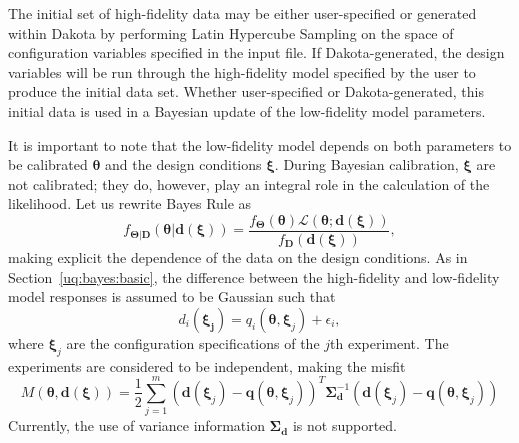 The initial set of high-fidelity data may be either user-specified or generated
within Dakota by performing Latin Hypercube Sampling on the space of 
configuration variables specified in the input file. If Dakota-generated, the 
design variables will be run through the high-fidelity model specified by the
user to produce the initial data set. Whether user-specified or 
Dakota-generated, this initial data is used in a Bayesian update of the 
low-fidelity model parameters. 

It is important to note that the low-fidelity model depends on both parameters 
to be calibrated $\boldsymbol{\theta}$ and the design conditions 
$\boldsymbol{\xi}$. During Bayesian calibration, $\boldsymbol{\xi}$ are not 
calibrated; they do, however, play an integral role in the calculation of the 
likelihood. Let us rewrite Bayes Rule as
\begin{equation}
{f_{\boldsymbol{\Theta |D}}}\left( \boldsymbol{\theta |d(\xi)} \right) 
= \frac{{{f_{\boldsymbol{\Theta}}}\left( \boldsymbol{\theta} \right)
\mathcal{L}\left( \boldsymbol{\theta;d(\xi)} \right)}}
{{{f_{\boldsymbol{D}}}\left( \boldsymbol{d(\xi)} \right)}},
\label{eq:expdesign_bayes}
\end{equation}
making explicit the dependence of the data on the design conditions. As in
Section~\ref{uq:bayes:basic}, the difference between the high-fidelity and 
low-fidelity model responses is assumed to be Gaussian such that
\begin{equation}
d_{i}(\boldsymbol{\xi_{j}}) = q_{i}(\boldsymbol{\theta,\xi}_{j}) + \epsilon_{i},
\end{equation}
where $\boldsymbol{\xi}_{j}$ are the configuration specifications of the $j$th 
experiment. The experiments are considered to be independent, making the misfit 
\begin{equation}
M(\boldsymbol{\theta, d(\xi)}) = \frac{1}{2} \sum_{j = 1}^{m} 
\left( \boldsymbol{d}(\boldsymbol{\xi}_{j}) - 
\boldsymbol{q}(\boldsymbol{\theta, \xi}_{j}) \right)^{T}
\boldsymbol{\Sigma}_{\boldsymbol{d}}^{-1}
\left( \boldsymbol{d}(\boldsymbol{\xi}_{j}) - 
\boldsymbol{q}(\boldsymbol{\theta, \xi}_{j}) \right)
\end{equation}
Currently, the use of variance information 
$\boldsymbol{\Sigma}_{\boldsymbol{d}}$ is not supported.

